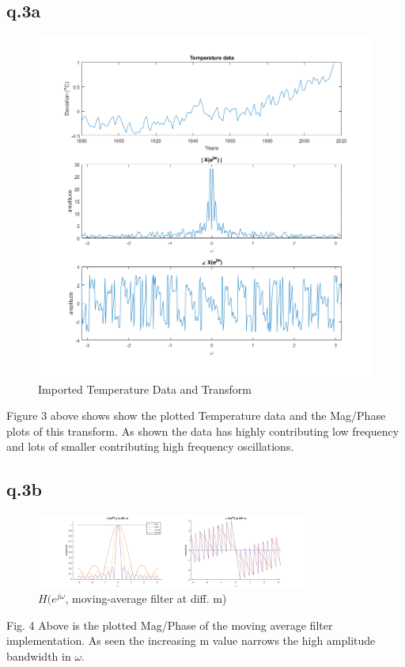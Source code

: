 \documentclass[11pt]{article}
\begin{document}
\subsection{q.3a}
\begin{figure}[h]
	\begin{center}
	\includegraphics[width=.5\textwidth]{q3_data}
	\caption{Imported Temperature Data and Transform}
	\end{center}
\end{figure}

Figure 3 above shows show the plotted Temperature data and the Mag/Phase plots of this transform. As shown the data has highly contributing low frequency and lots of smaller contributing high frequency oscillations.
\subsection{q.3b}
\begin{figure}[h]
	\begin{center}
	\includegraphics[width=0.8\textwidth]{q3_H}
	\caption{$H(e^{j\omega}$, moving-average filter at diff. m)}
	\end{center}
\end{figure}
Fig. 4 Above is the plotted Mag/Phase of the moving average filter implementation. As seen the increasing m value narrows the high amplitude bandwidth in $\omega$.

\newpage
\end{document}
